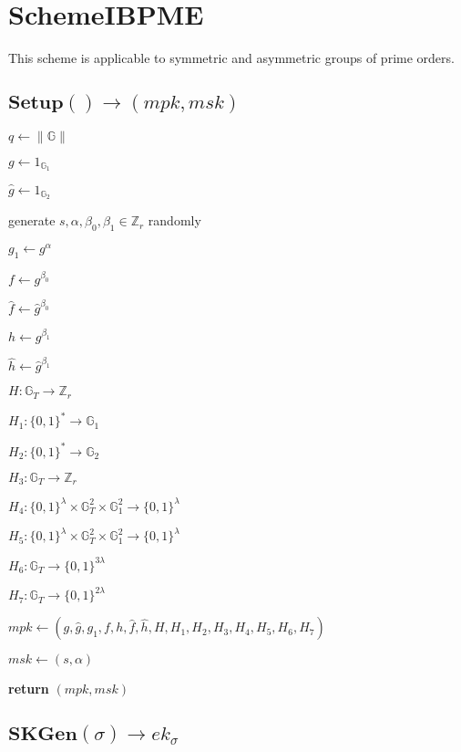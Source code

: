 \documentclass[a4paper]{article}
\begin{document}
\section{SchemeIBPME}

This scheme is applicable to symmetric and asymmetric groups of prime orders. 

\subsection{$\textbf{Setup}() \rightarrow (\textit{mpk}, \textit{msk})$}

$q \gets \|\mathbb{G}\|$

$g \gets 1_{\mathbb{G}_1}$

$\hat{g} \gets 1_{\mathbb{G}_2}$

generate $s, \alpha, \beta_0, \beta_1 \in \mathbb{Z}_r$ randomly

$g_1 \gets g^\alpha$

$f \gets g^{\beta_0}$

$\hat{f} \gets \hat{g}^{\beta_0}$

$h \gets g^{\beta_1}$

$\hat{h} \gets \hat{g}^{\beta_1}$

$H: \mathbb{G}_T \rightarrow \mathbb{Z}_r$

$H_1: \{0, 1\}^* \rightarrow \mathbb{G}_1$

$H_2: \{0, 1\}^* \rightarrow \mathbb{G}_2$

$H_3: \mathbb{G}_T \rightarrow \mathbb{Z}_r$

$H_4: \{0, 1\}^\lambda \times \mathbb{G}_T^2 \times \mathbb{G}_1^2 \rightarrow \{0, 1\}^\lambda$

$H_5: \{0, 1\}^\lambda \times \mathbb{G}_T^2 \times \mathbb{G}_1^2 \rightarrow \{0, 1\}^\lambda$

$H_6: \mathbb{G}_T \rightarrow \{0, 1\}^{3\lambda}$

$H_7: \mathbb{G}_T \rightarrow \{0, 1\}^{2\lambda}$

$ \textit{mpk} \gets (g, \hat{g}, g_1, f, h, \hat{f}, \hat{h}, H, H_1, H_2, H_3, H_4, H_5, H_6, H_7)$

$\textit{msk} \gets (s, \alpha)$

\textbf{return} $(\textit{mpk}, \textit{msk})$

\subsection{$\textbf{SKGen}(\sigma) \rightarrow \textit{ek}_\sigma$}
\end{document}
